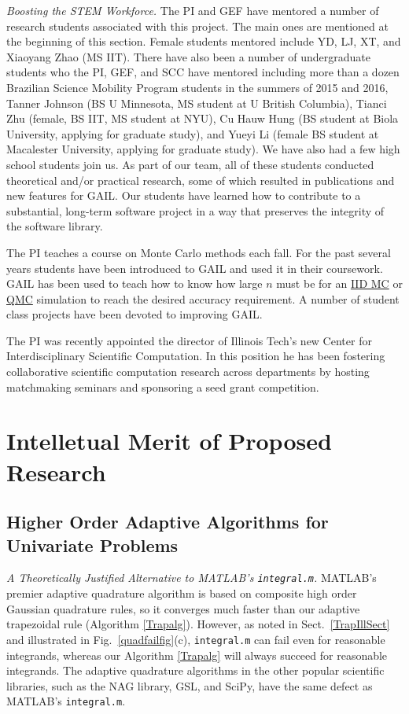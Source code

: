 \documentclass[11pt]{NSFamsart}
\newcommand{\QMC}{\hyperlink{QMClink}{QMC}\xspace}
\newcommand{\IIDMC}{\hyperlink{IIDMClink}{IID MC}\xspace}
\begin{document}
\emph{Boosting the STEM Workforce.} The PI and GEF have mentored a number of 
research students associated with this project.  The main ones are mentioned at the beginning of 
this section.  Female students mentored include YD, LJ, XT, and Xiaoyang Zhao (MS IIT).   There 
have also been a 
number of 
undergraduate students who the PI, GEF, and SCC have mentored including more than a dozen 
Brazilian Science Mobility Program students in the summers of 2015 and 2016, Tanner Johnson (BS 
U 
Minnesota, MS student at U British Columbia), Tianci Zhu 
(female, BS IIT, MS student at NYU),  Cu Hauw Hung (BS student at Biola University, applying for 
graduate study), and Yueyi Li (female BS student at Macalester University, applying for 
graduate study).  We have also had a few high school students join us. As part of our team, all of 
these students conducted theoretical and/or practical research, some of which resulted in 
publications and new features for GAIL.  Our students have learned how to contribute to a 
substantial, long-term software project in a way that preserves the integrity of the software library.

The PI teaches a course on Monte Carlo methods each fall.  For the past several years students 
have been introduced to GAIL and used it in their coursework.  GAIL has been used to teach how to 
know how large $n$ must be for an \IIDMC or \QMC simulation to reach the desired accuracy 
requirement.  A number of student class projects have been devoted to improving GAIL.

The PI was recently appointed the director of Illinois Tech's new Center for Interdisciplinary 
Scientific Computation.  In this position he has been fostering collaborative scientific computation 
research across departments by hosting matchmaking seminars and sponsoring a seed grant 
competition.


\section{Intelletual Merit of Proposed Research} \label{secProposed}


\subsection{Higher Order Adaptive Algorithms for Univariate Problems}\label{SectUniProb}

\emph{A Theoretically Justified Alternative to MATLAB's 
\textup{\texttt{integral.m}}.} 
MATLAB's premier adaptive quadrature algorithm is based on composite high order Gaussian 
quadrature rules, so it converges much faster than our adaptive trapezoidal rule (Algorithm 
\ref{Trapalg}). However, as noted in Sect.\ \ref{TrapIllSect} and illustrated in Fig.\ 
\ref{quadfailfig}(c), 
\texttt{integral.m} can fail even for reasonable integrands, whereas our Algorithm 
\ref{Trapalg} will always succeed for reasonable integrands. The adaptive quadrature algorithms in 
the other popular scientific libraries, 
such as the NAG library, GSL, and SciPy, have the same defect as MATLAB's \texttt{integral.m}.  
\end{document}
